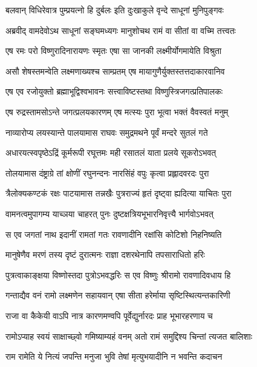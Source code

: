 \twolineshloka
{बलवान् विधिरेवात्र पुम्प्रयत्नो हि दुर्बलः}
{इति दुःखाकुले वृन्दे साधूनां मुनिपुङ्गवः} %

\twolineshloka
{अब्रवीद् वामदेवोऽथ साधूनां सङ्घमध्यगः}
{मानुशोचथ रामं वा सीतां वा वच्मि तत्त्वतः} %

\twolineshloka
{एष रमः परो विष्णुरादिनारायणः स्मृतः}
{एषा सा जानकी लक्ष्मीर्योगमायेति विश्रुता} %

\twolineshloka
{असौ शेषस्तमन्वेति लक्ष्मणाख्यश्च साम्प्रतम्}
{एष मायागुणैर्युक्तस्तत्तदाकारवानिव} %

\twolineshloka
{एष एव रजोयुक्तो ब्रह्माभूद्विश्वभावनः}
{सत्त्वाविष्टस्तथा विष्णुस्त्रिजगत्प्रतिपालकः} %

\twolineshloka
{एष रुद्रस्तामसोऽन्ते जगत्प्रलयकारणम्}
{एष मत्स्यः पुरा भूत्वा भक्तं वैवस्वतं मनुम्} %

\twolineshloka
{नाव्यारोप्य लयस्यान्ते पालयामास राघवः}
{समुद्रमथने पूर्वं मन्दरे सुतलं गते} %

\twolineshloka
{अधारयत्स्वपृष्ठेऽद्रिं कूर्मरूपी रघूत्तमः}
{मही रसातलं याता प्रलये सूकरोऽभवत्} %

\twolineshloka
{तोलयामास दंष्ट्राग्रे तां क्षोणीं रघुनन्दनः}
{नारसिंहं वपुः कृत्वा प्रह्लादवरदः पुरा} %

\twolineshloka
{त्रैलोक्यकण्टकं रक्षः पाटयामास तन्नखैः}
{पुत्रराज्यं हृतं दृष्ट्वा ह्यदित्या याचितः पुरा} %

\twolineshloka
{वामनत्वमुपागम्य याच्ञया चाहरत् पुनः}
{दुष्टक्षत्रियभूभारनिवृत्त्यै भार्गवोऽभवत्} %

\twolineshloka
{स एव जगतां नाथ इदानीं रामतां गतः}
{रावणादीनि रक्षांसि कोटिशो निहनिष्यति} %

\twolineshloka
{मानुषेणैव मरणं तस्य दृष्टं दुरात्मनः}
{राज्ञा दशरथेनापि तपसाराधितो हरिः} %

\twolineshloka
{पुत्रत्वाकाङ्क्षया विष्णोस्तदा पुत्रोऽभवद्धरिः}
{स एव विष्णुः श्रीरामो रावणादिवधाय हि} %

\twolineshloka
{गन्ताद्यैव वनं रामो लक्ष्मणेन सहायवान्}
{एषा सीता हरेर्माया सृष्टिस्थित्यन्तकारिणी} %

\twolineshloka
{राजा वा कैकेयी वाऽपि नात्र कारणमण्वपि}
{पूर्वेद्युर्नारदः प्राह भूभारहरणाय च} %

\twolineshloka
{रामोऽप्याह स्वयं साक्षाच्छ्वो गमिष्याम्यहं वनम्}
{अतो रामं समुद्दिश्य चिन्तां त्यजत बालिशाः} %

\twolineshloka
{राम रामेति ये नित्यं जपन्ति मनुजा भुवि}
{तेषां मृत्युभयादीनि न भवन्ति कदाचन} %

